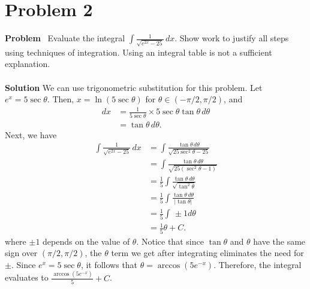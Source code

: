 \section{Problem 2}
\edef\sectionheader{February 16}

\noindent \textbf{Problem} \ Evaluate the integral $\int \frac{1}{\sqrt{e^{2x}-25}} \,dx$. Show work to justify all steps using techniques of
integration. Using an integral table is not a sufficient explanation.
\\\\
\noindent \textbf{Solution} We can use trigonometric substitution for this problem. Let $e^x = 5\sec\theta$. Then, $x = \ln(5\sec\theta)$ for $\theta \in (-\pi/2,\pi/2)$, and
\begin{align*}
    dx & = \frac{1}{5\sec\theta} \times 5\sec\theta\tan\theta \,d\theta \\
    & = \tan\theta \,d\theta.
\end{align*}
Next, we have
\begin{align*}
    \int \frac{1}{\sqrt{e^{2x}-25}} \,dx & = \int \frac{\tan\theta \,d\theta}{\sqrt{25\sec^2\theta - 25}} \\
    & = \int \frac{\tan\theta \,d\theta}{\sqrt{25(\sec^2\theta - 1)}} \\
    & = \frac15 \int \frac{\tan\theta \,d\theta}{\sqrt{\tan^2\theta}} \\
    & = \frac15 \int \frac{\tan\theta \,d\theta}{\left|\tan\theta\right|} \\
    & = \frac15 \int \, \pm 1 d\theta \\
    & = \frac15 \theta + C.
\end{align*}
where $\pm 1$ depends on the value of $\theta$. Notice that since $\tan\theta$ and $\theta$ have the same sign over $(\pi/2, \pi/2)$, the $\theta$ term we get after integrating eliminates the need for $\pm$. Since $e^x = 5\sec\theta$, it follows that $\theta = \arccos(5e^{-x})$. Therefore, the integral evaluates to $\frac{\arccos(5e^{-x})}{5} + C$.
